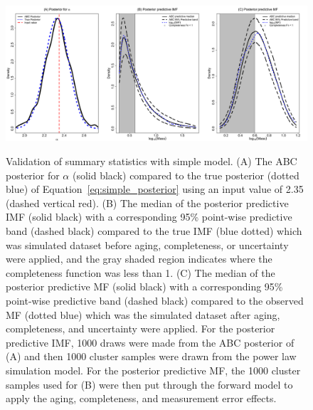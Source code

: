 \documentclass[12pt]{article}
\begin{document}
\begin{figure}[htbp]
   \centering
\includegraphics[width = .99\textwidth]{figures/basic_1_1000.pdf}  \\
   \caption{Validation of summary statistics with simple model.  (A) The ABC posterior for $\alpha$ (solid black) compared to the true posterior (dotted blue) of Equation~\eqref{eq:simple_posterior} using an input value of 2.35 (dashed vertical red).  (B) The median of the posterior predictive IMF (solid black) with a corresponding 95\% point-wise predictive band (dashed black) compared to the true IMF (blue dotted) which was simulated dataset before aging, completeness, or uncertainty were applied, and the gray shaded region indicates where the completeness function was less than 1.  (C) The median of the posterior predictive MF (solid black) with a corresponding 95\% point-wise predictive band (dashed black) compared to the observed MF (dotted blue) which was the simulated dataset after aging, completeness, and uncertainty were applied.  For the posterior predictive IMF, 1000 draws were made from the ABC posterior of (A) and then 1000 cluster samples were drawn from the power law simulation model.  For the posterior predictive MF, the 1000 cluster samples used for (B) were then put through the forward model to apply the aging, completeness, and measurement error effects.
} \label{fig:abc_simple}
\end{figure}



%
%
%
%
\end{document}
